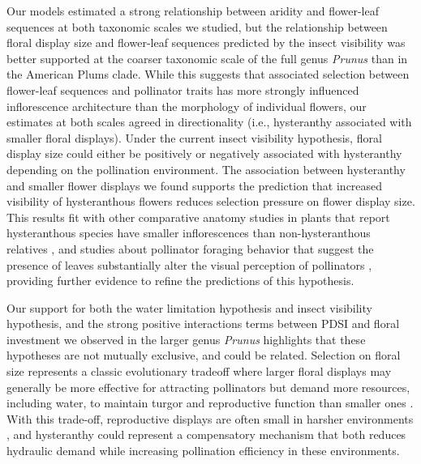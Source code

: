 \documentclass{article}[12pt]
\begin{document}
{Our models estimated a strong relationship between aridity and flower-leaf sequences at both taxonomic scales we studied, but the relationship between floral display size and flower-leaf sequences predicted by the insect visibility was better supported at the coarser taxonomic scale of the full genus \emph{Prunus} than in the American Plums clade. While this suggests that associated selection between flower-leaf sequences and pollinator traits has more strongly influenced inflorescence architecture than the morphology of individual flowers, our estimates at both scales agreed in directionality (i.e., hysteranthy associated with smaller floral displays). Under the current insect visibility hypothesis, floral display size could either be positively or negatively associated with hysteranthy depending on the pollination environment. The association between hysteranthy and smaller flower displays we found supports the prediction that increased visibility of hysteranthous flowers reduces selection pressure on flower display size. This results fit with other comparative anatomy studies in plants that report hysteranthous species have smaller inflorescences than non-hysteranthous relatives \citep{Gunatilleke1984}, and studies about pollinator foraging behavior that suggest the presence of leaves substantially alter the visual perception of pollinators \citep{Forrest:2009aa,Rivest:2017aa}, providing further evidence to refine the predictions of this hypothesis.

Our support for both the water limitation hypothesis and insect visibility hypothesis, and the strong positive interactions terms between PDSI and floral investment we observed in the larger genus \emph{Prunus} highlights that these hypotheses are not mutually exclusive, and could be related. Selection on floral size represents a classic evolutionary tradeoff where larger floral displays may generally be more effective for attracting pollinators but demand more resources, including water, to maintain turgor and reproductive function than smaller ones \citep{Galen:1999vr,Lambrecht:2007ur}. With this trade-off, reproductive displays are often small in harsher environments \citep{Teixido:2016aa,Lambrecht:2013aa}, and hysteranthy could represent a compensatory mechanism that both reduces hydraulic demand while increasing pollination efficiency in these environments. %
 
}
\end{document}
